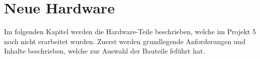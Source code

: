 \newpage

\section{Neue Hardware}
\label{sec:Neue Hardware}

Im folgenden Kapitel werden die Hardware-Teile beschrieben, welche im Projekt 5 noch nicht erarbeitet wurden. Zuerst werden grundlegende Anforderungen und Inhalte beschrieben, welche zur Auswahl der Bauteile feführt hat.